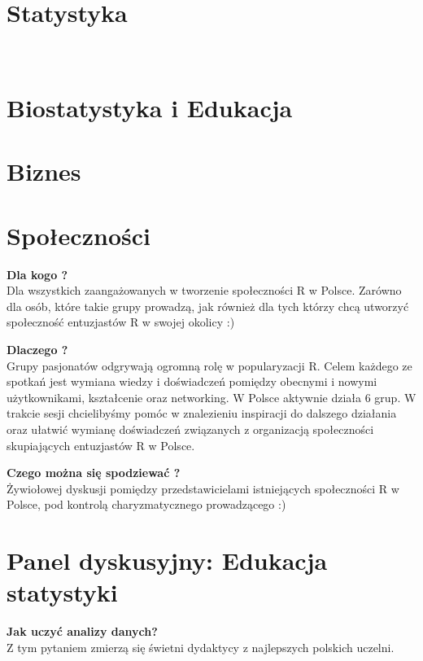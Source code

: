 \documentclass[11pt,twoside,b5paper]{book}
\begin{document}
\section{Statystyka}
\newpage
\newpage



\newpage \
\newpage
\section{Biostatystyka i Edukacja}

\newpage



\newpage
\section{Biznes}

\newpage



\newpage
\section{Społeczności}
\textbf{Dla kogo ?} \\
Dla wszystkich zaangażowanych w tworzenie społeczności R w Polsce. Zarówno dla osób, które takie grupy prowadzą, jak również dla tych którzy chcą utworzyć społeczność entuzjastów R w swojej okolicy :)

\textbf{Dlaczego ?}\\
Grupy pasjonatów odgrywają ogromną rolę w popularyzacji R. Celem każdego ze spotkań jest wymiana wiedzy i doświadczeń pomiędzy obecnymi i nowymi użytkownikami, kształcenie oraz networking. W Polsce aktywnie działa 6 grup. W trakcie sesji chcielibyśmy pomóc w znalezieniu inspiracji do dalszego działania oraz ułatwić wymianę doświadczeń związanych z organizacją społeczności skupiających entuzjastów R w Polsce.

\textbf{Czego można się spodziewać ?}\\
Żywiołowej dyskusji pomiędzy przedstawicielami istniejących społeczności R w Polsce, pod kontrolą charyzmatycznego prowadzącego :)
\section{Panel dyskusyjny: Edukacja statystyki}
\textbf{Jak uczyć analizy danych?}\\
Z tym pytaniem zmierzą się świetni dydaktycy z najlepszych polskich uczelni.
\end{document}
